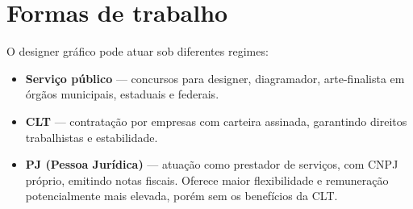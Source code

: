 \documentclass[a4paper,12pt]{article}
\begin{document}
\section{Formas de trabalho}

O designer gráfico pode atuar sob diferentes regimes:

\begin{itemize}[nosep]
  \item \textbf{Serviço público} --- concursos para designer, diagramador, arte-finalista em órgãos municipais, estaduais e federais.
  \item \textbf{CLT} --- contratação por empresas com carteira assinada, garantindo direitos trabalhistas e estabilidade.
  \item \textbf{PJ (Pessoa Jurídica)} --- atuação como prestador de serviços, com CNPJ próprio, emitindo notas fiscais. Oferece maior flexibilidade e remuneração potencialmente mais elevada, porém sem os benefícios da CLT.
\end{itemize}
\end{document}
